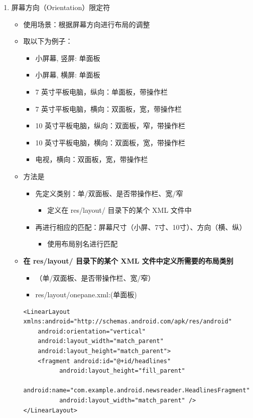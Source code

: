 \documentclass[9pt, b5paper]{article}
\begin{document}
\begin{enumerate}
\begin{enumerate}
\begin{enumerate}
\item 屏幕方向（Orientation）限定符
\label{sec-6-6-1-1-2-4}
\begin{itemize}
\item 使用场景：根据屏幕方向进行布局的调整
\item 取以下为例子：
\begin{itemize}
\item 小屏幕, 竖屏: 单面板
\item 小屏幕, 横屏: 单面板
\item 7 英寸平板电脑，纵向：单面板，带操作栏
\item 7 英寸平板电脑，横向：双面板，宽，带操作栏
\item 10 英寸平板电脑，纵向：双面板，窄，带操作栏
\item 10 英寸平板电脑，横向：双面板，宽，带操作栏
\item 电视，横向：双面板，宽，带操作栏
\end{itemize}
\item 方法是
\begin{itemize}
\item 先定义类别：单/双面板、是否带操作栏、宽/窄
\begin{itemize}
\item 定义在 res/layout/ 目录下的某个 XML 文件中
\end{itemize}
\item 再进行相应的匹配：屏幕尺寸（小屏、7寸、10寸）、方向（横、纵）
\begin{itemize}
\item 使用布局别名进行匹配
\end{itemize}
\end{itemize}
\item \textbf{在 res/layout/ 目录下的某个 XML 文件中定义所需要的布局类别}
\begin{itemize}
\item （单/双面板、是否带操作栏、宽/窄）
\item res/layout/onepane.xml:(单面板)
\end{itemize}
\begin{verbatim}
<LinearLayout xmlns:android="http://schemas.android.com/apk/res/android"  
    android:orientation="vertical"  
    android:layout_width="match_parent"  
    android:layout_height="match_parent">  
    <fragment android:id="@+id/headlines"  
          android:layout_height="fill_parent"  
          android:name="com.example.android.newsreader.HeadlinesFragment"  
          android:layout_width="match_parent" />  
</LinearLayout>

\end{verbatim}
\end{itemize}
\end{enumerate}
\end{enumerate}
\end{enumerate}
\end{document}
